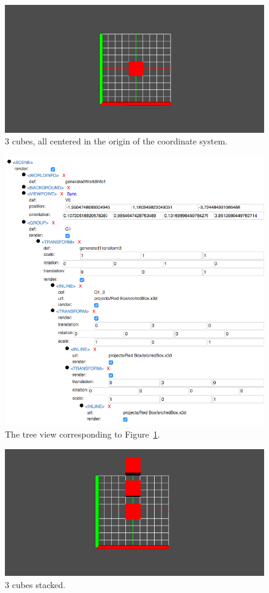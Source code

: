 \begin{figure}
  \centering
  \includegraphics[width=\textwidth]{../assets/origin.png}
  \caption{3 cubes, all centered in the origin of the coordinate system.}
  \label{fig:origin}
\end{figure}
\begin{figure}
  \centering
  \includegraphics[width=\textwidth]{../assets/origin-tree.png}
  \caption{The tree view corresponding to Figure~\ref{fig:origin}.}
  \label{fig:origin-tree}
\end{figure}
\begin{figure}
  \centering
  \includegraphics[width=\textwidth]{../assets/stack.png}
  \caption{3 cubes stacked.}
  \label{fig:stack}
\end{figure}
